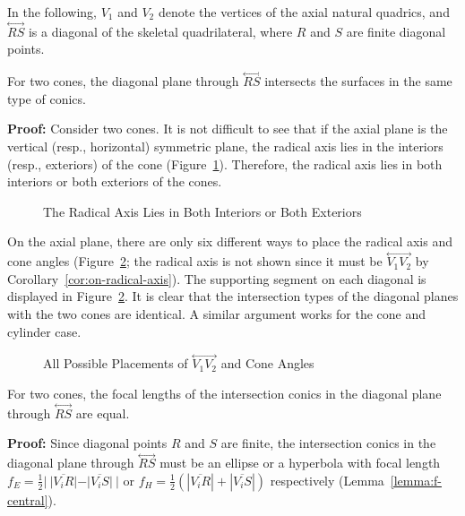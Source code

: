      In the following, $V_1$ and $V_2$ denote the vertices of the
axial natural quadrics, and $\stackrel{\longleftrightarrow}{RS}$ is a diagonal
of the skeletal quadrilateral, where $R$ and $S$ are finite diagonal points.

\begin{lemma}
\label{lemma-1}
     For two cones, the diagonal plane through 
$\stackrel{\longleftrightarrow}{RS}$
intersects the surfaces in the same type of conics.
\end{lemma}
{\bf Proof:}  Consider two cones.  It is not difficult to see that if the 
axial plane is the
vertical (resp., horizontal) symmetric plane, the radical axis lies in the
interiors (resp., exteriors) of the cone (Figure~\ref{fig:int-ext}).  
Therefore, the radical axis lies in both interiors or both exteriors of the 
cones.
\begin{figure}
\vspace{7.5cm}
\caption{The Radical Axis Lies in Both Interiors or Both Exteriors}
\label{fig:int-ext}
\end{figure}

     On the axial plane, there are only six different ways to place the radical
axis and  cone angles (Figure~\ref{fig:configs}; the radical axis is not
shown  since it must be $\stackrel{\longleftrightarrow}{V_1V_2}$ by
Corollary~\ref{cor:on-radical-axis}).  The supporting segment on each diagonal
is displayed in Figure~\ref{fig:configs}.  It is clear that the intersection
types of the diagonal planes with the two cones are identical.  A similar 
argument works for the cone and cylinder case.  \QED
\begin{figure}
\vspace{6cm}
\caption{All Possible Placements of $\stackrel{\longleftrightarrow}{V_1V_2}$ and Cone Angles}
\label{fig:configs}
\end{figure}

\begin{lemma}
\label{lemma-2}
     For two cones, the focal lengths of the intersection conics in the 
diagonal plane through $\stackrel{\longleftrightarrow}{RS}$ are equal.
\end{lemma}
{\bf Proof:}  Since diagonal points $R$ and $S$ are finite, the intersection 
conics in the diagonal plane through $\stackrel{\longleftrightarrow}{RS}$ must
be an ellipse or a hyperbola with focal length
$f_E=\frac{1}{2}|\ |\overline{V_iR}|-|\overline{V_iS}|\ |$ or
$f_H=\frac{1}{2}(|\overline{V_iR}|+|\overline{V_iS}|)$ respectively
(Lemma~\ref{lemma:f-central}).  

